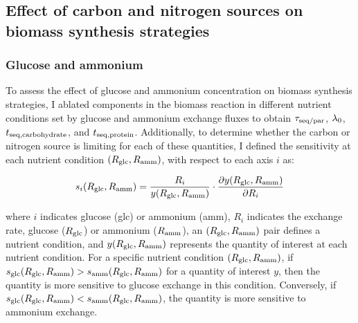 \subsection{Effect of carbon and nitrogen sources on biomass synthesis strategies}
\label{subsec:model-grid}

\subsubsection{Glucose and ammonium}
\label{subsec:model-grid-glucose}


To assess the effect of glucose and ammonium concentration on biomass synthesis strategies, I ablated components in the biomass reaction in different nutrient conditions set by glucose and ammonium exchange fluxes
to obtain $\tau_{\mathrm{seq}/\mathrm{par}}$, $\lambda_{0}$, $t_{\mathrm{seq},\mathrm{carbohydrate}}$, and $t_{\mathrm{seq},\mathrm{protein}}$.
Additionally, to determine whether the carbon or nitrogen source is limiting for each of these quantities, I defined the sensitivity at each nutrient condition $(R_{\mathrm{glc}}, R_{\mathrm{amm}})$, with respect to each axis $i$ as:

\begin{equation}
  s_{i}(R_{\mathrm{glc}}, R_{\mathrm{amm}}) = \frac{R_{i}}{y(R_{\mathrm{glc}}, R_{\mathrm{amm}})} \cdot \frac{\partial y(R_{\mathrm{glc}}, R_{\mathrm{amm}})}{\partial R_{i}}
  \label{eq:model-susceptibility}
\end{equation}

where
$i$ indicates glucose (glc) or ammonium (amm),
$R_{i}$ indicates the exchange rate, glucose ($R_{\mathrm{glc}}$) or ammonium ($R_{\mathrm{amm}}$),
an $(R_{\mathrm{glc}}, R_{\mathrm{amm}})$ pair defines a nutrient condition, and
$y(R_{\mathrm{glc}}, R_{\mathrm{amm}})$ represents the quantity of interest at each nutrient condition.
For a specific nutrient condition $(R_{\mathrm{glc}}, R_{\mathrm{amm}})$, if $s_{\mathrm{glc}}(R_{\mathrm{glc}}, R_{\mathrm{amm}}) > s_{\mathrm{amm}}(R_{\mathrm{glc}}, R_{\mathrm{amm}})$ for a quantity of interest $y$, then the quantity is more sensitive to glucose exchange in this condition.
Conversely, if $s_{\mathrm{glc}}(R_{\mathrm{glc}}, R_{\mathrm{amm}}) < s_{\mathrm{amm}}(R_{\mathrm{glc}}, R_{\mathrm{amm}})$, the quantity is more sensitive to ammonium exchange.

